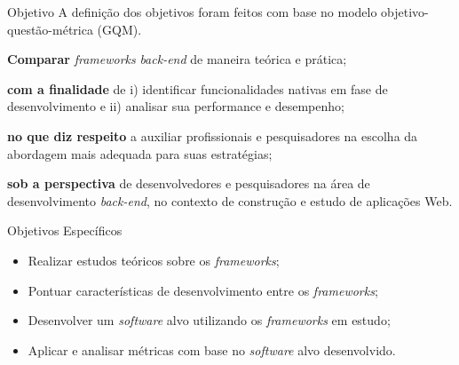 \documentclass{libs/ufc_format}
\begin{document}
\begin{frame}{Objetivo}
    A definição dos objetivos foram feitos com base no modelo objetivo-questão-métrica (GQM)\nocite{6156}\let\thefootnote\relax{}.

    \textbf{Comparar} \textit{frameworks} \textit{back-end} de maneira teórica e prática; 

    \textbf{com a finalidade} de i) identificar funcionalidades nativas em fase de desenvolvimento e ii) analisar sua performance e desempenho;

    \textbf{no que diz respeito} a auxiliar profissionais e pesquisadores na escolha da abordagem mais adequada para suas estratégias;

    \textbf{sob a perspectiva} de desenvolvedores e pesquisadores na área de desenvolvimento \textit{back-end}, no contexto de construção e estudo de aplicações Web.
\end{frame}


\begin{frame}{Objetivos Específicos}
     \begin{itemize}
        \item Realizar estudos teóricos sobre os \textit{frameworks};
        \vspace*{0.5em}
        \item Pontuar características de desenvolvimento entre os \textit{frameworks};
        \vspace*{0.5em}
        \item Desenvolver um \textit{software} alvo utilizando os \textit{frameworks} em estudo;
        \vspace*{0.5em}
        \item Aplicar e analisar métricas com base no \textit{software} alvo desenvolvido.
    \end{itemize}
\end{frame}
\end{document}
